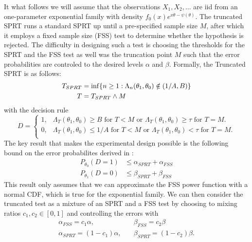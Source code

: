 \documentclass[11pt]{article}
\begin{document}
It what follows we will assume that the observations $X_1, X_2, \dots$ are iid from an one-parameter exponential family with density $f_0(x)e^{x\theta - \psi(\theta)}$. The truncated SPRT runs a standard SPRT up until a pre-specified sample size $M$, after which it employs a fixed sample size (FSS) test to determine whether the hypothesis is rejected. The difficulty in designing such a test is choosing the thresholds for the SPRT and the FSS test as well was the truncation point $M$ such that the error probabilities are controled to the desired levels $\alpha$ and $\beta$. Formally, the Truncated SPRT is as follows:
\begin{equation}
\begin{split}
T_{SPRT} &= \inf\{n \geq 1 : \Lambda_n(\theta_1, \theta_0) \notin (1/A, B)\} \\
T &= T_{SPRT} \wedge M
\end{split}
\end{equation}
with the decision rule
\begin{equation}
D =
\begin{cases}
1, & \Lambda_T(\theta_1, \theta_0) \geq B \text{ for } T < M \text{ or } \Lambda_T(\theta_1, \theta_0) \geq \tau \text{ for } T = M.\\
0, & \Lambda_T(\theta_1, \theta_0) \leq 1/A \text{ for } T < M \text{ or } \Lambda_T(\theta_1, \theta_0) < \tau \text{ for } T = M.\\
\end{cases}
\end{equation}
The key result that makes the experimental design possible is the following bound on the error probabilites derived in \citet{tantara1977}:
\begin{equation}
\begin{split}
P_{\theta_0}(D = 1) &\leq \alpha_{SPRT} + \alpha_{FSS} \\
P_{\theta_1}(D = 0) &\leq \beta_{SPRT} + \beta_{FSS}
\end{split}
\end{equation}
This result only assumes that we can approximate the FSS power function with a normal CDF, which is true for the exponential family. We can then consider the truncated test as a mixture of an SPRT and a FSS test by choosing to mixing ratios $c_1, c_2 \in \left[0, 1\right]$ and controlling the errors with
\begin{equation}
\begin{split}
\alpha_{FSS} = c_1 \alpha, \quad &\beta_{FSS} = c_2 \beta \\
\alpha_{SPRT} = (1 - c_1) \alpha, \quad &\beta_{SPRT} = (1 - c_2) \beta.
\end{split}
\end{equation}
\end{document}
